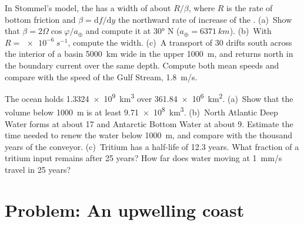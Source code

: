 \begin{exercise}[$\star\star\star$]\label{exo:b1:ocean-circulation:11}
In Stommel's model, the  has a width of about $R/\beta$,
where $R$ is the rate of bottom friction and $\beta = \mathrm df/\mathrm dy$ the
northward rate of increase of the . (a)~Show that $\beta = 2\Omega
\cos\varphi/a_\oplus$ and compute it at \ang{30} N ($a_\oplus = \qty{6371}{km}$).
(b)~With $R = \qty{e-6}{s^{-1}}$, compute the width. (c)~A transport of
\qty{30}{\sverdrup} drifts south across the interior of a basin \qty{5000}{km} wide
in the upper \qty{1000}{m}, and returns north in the boundary current over the same
depth. Compute both mean speeds and compare with the speed of the Gulf Stream,
\qty{1.8}{m/s}.
\end{exercise}

\begin{exercise}[$\star\star\star$]\label{exo:b1:ocean-circulation:12}
The ocean holds \qty{1.3324e9}{km^3} over \qty{361.84e6}{km^2}. (a)~Show that the
volume below \qty{1000}{m} is at least \qty{9.71e8}{km^3}. (b)~North Atlantic Deep
Water forms at about \qty{17}{\sverdrup} and Antarctic Bottom Water at about
\qty{9}{\sverdrup}. Estimate the time needed to renew the water below
\qty{1000}{m}, and compare with the thousand years of the conveyor. (c)~Tritium has a
half-life of 12.3 years. What fraction of a tritium input remains after 25 years? How
far does water moving at \qty{1}{mm/s} travel in 25 years?
\end{exercise}

\section{Problem: An upwelling coast}

